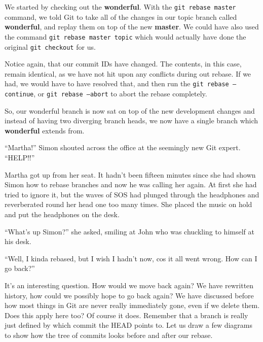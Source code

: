 We started by checking out the \textbf{wonderful}.  With the \texttt{git rebase master} command, we told Git to take all of the changes in our topic branch called \textbf{wonderful}, and replay them on top of the new \textbf{master}.  We could have also used the command \texttt{git rebase master topic} which would actually have done the original \texttt{git checkout} for us.  

Notice again, that our commit IDs have changed.  The contents, in this case, remain identical, as we have not hit upon any conflicts during out rebase.  If we had, we would have to have resolved that, and then run the \texttt{git rebase --continue}, or \texttt{git rebase --abort} to abort the rebase completely.

So, our wonderful branch is now sat on top of the new development changes and instead of having two diverging branch heads, we now have a single branch which \textbf{wonderful} extends from.

\begin{trenches}
``Martha!''  Simon shouted across the office at the seemingly new Git expert.  ``HELP!!''

Martha got up from her seat.  It hadn't been fifteen minutes since she had shown Simon how to rebase branches and now he was calling her again.  At first she had tried to ignore it, but the waves of SOS had plunged through the headphones and reverberated round her head one too many times.  She placed the music on hold and put the headphones on the desk.

``What's up Simon?'' she asked, smiling at John who was chuckling to himself at his desk.

``Well, I kinda rebased, but I wish I hadn't now, cos it all went wrong.  How can I go back?''
\end{trenches}

It's an interesting question.  How would we move back again?  We have rewritten history, how could we possibly hope to go back again?  We have discussed before how most things in Git are never really immediately gone, even if we delete them.  Does this apply here too?  Of course it does.  Remember that a branch is really just defined by which commit the HEAD points to.  Let us draw a few diagrams to show how the tree of commits looks before and after our rebase.

